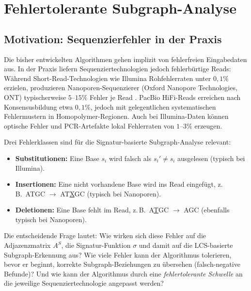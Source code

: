﻿\documentclass[a4paper,12pt]{article}
\theoremstyle{definition}
\begin{document}
\section{Fehlertolerante Subgraph-Analyse}
\label{sec:fuzzy}

\subsection{Motivation: Sequenzierfehler in der Praxis}

Die bisher entwickelten Algorithmen gehen implizit von fehlerfreien
Eingabedaten aus. In der Praxis liefern Sequenziertechnologien jedoch
fehlerb\"{u}rtige Reads: W\"{a}hrend Short-Read-Technologien wie Illumina
Rohfehlerraten unter $0{,}1\%$ erzielen, produzieren Nanoporen-Sequenzierer
(Oxford Nanopore Technologies, ONT) typischerweise $5$--$15\%$ Fehler je Read
\cite{deamer2016}. PacBio HiFi-Reads erreichen nach Konsensusbildung etwa
$0{,}1\%$, jedoch mit gelegentlichen systematischen Fehlermustern in
Homopolymer-Regionen. Auch bei Illumina-Daten k\"{o}nnen optische Fehler
und PCR-Artefakte lokal Fehlerraten von $1$--$3\%$ erzeugen.

Drei Fehlerklassen sind f\"{u}r die Signatur-basierte Subgraph-Analyse relevant:

\begin{itemize}
    \item \textbf{Substitutionen:} Eine Base $s_i$ wird falsch als
          $s_i' \neq s_i$ ausgelesen (typisch bei Illumina).
    \item \textbf{Insertionen:} Eine nicht vorhandene Base wird ins Read
          eingef\"{u}gt, z.\,B.\ ATGC $\to$ AT\underline{X}GC
          (typisch bei Nanoporen).
    \item \textbf{Deletionen:} Eine Base fehlt im Read, z.\,B.\ A\underline{T}GC
          $\to$ AGC (ebenfalls typisch bei Nanoporen).
\end{itemize}

\noindent
Die entscheidende Frage lautet: Wie wirken sich diese Fehler auf die
Adjazenzmatrix $A^S$, die Signatur-Funktion $\sigma$ und damit auf die
LCS-basierte Subgraph-Erkennung aus?  Wie viele Fehler kann der Algorithmus
tolerieren, bevor er beginnt, korrekte Subgraph-Beziehungen zu \"{u}bersehen
(falsch-negative Befunde)?  Und wie kann der Algorithmus durch eine
\textit{fehlertolerante Schwelle} an die jeweilige Sequenziertechnologie
angepasst werden?
\end{document}

